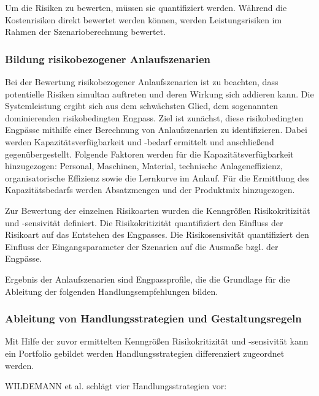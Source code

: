 Um die Risiken zu bewerten, müssen sie quantifiziert werden. Während die Kostenrisiken direkt bewertet werden können, werden Leistungsrisiken im Rahmen der Szenarioberechnung bewertet. 

\subsubsection*{Bildung risikobezogener Anlaufszenarien}\label{sec:wildemannszenarien}
Bei der Bewertung risikobezogener Anlaufszenarien ist zu beachten, dass potentielle Risiken simultan auftreten und deren Wirkung sich addieren kann. Die Systemleistung ergibt sich aus dem schwächsten Glied, dem sogenannten dominierenden risikobedingten Engpass. Ziel ist zunächst, diese risikobedingten Engpässe mithilfe einer Berechnung von Anlaufszenarien zu identifizieren. %
Dabei werden Kapazitätsverfügbarkeit und -bedarf ermittelt und anschließend gegenübergestellt. Folgende Faktoren werden für die Kapazitätsverfügbarkeit hinzugezogen: Personal, Maschinen, Material, technische Anlageneffizienz, organisatorische Effizienz sowie die Lernkurve im Anlauf. %
Für die Ermittlung des Kapazitätsbedarfs werden Absatzmengen und der Produktmix hinzugezogen. 

Zur Bewertung der einzelnen Risikoarten wurden die Kenngrößen Risikokritizität und -sensivität definiert. 
Die Risikokritizität quantifiziert den Einfluss der Risikoart auf das Entstehen des Engpasses. Die Risikosensivität quantifiziert den Einfluss der Eingangsparameter der Szenarien auf die Ausmaße bzgl. der Engpässe. 

Ergebnis der Anlaufszenarien sind Engpassprofile, die die Grundlage für die Ableitung der folgenden Handlungsempfehlungen bilden. 

\subsubsection*{Ableitung von Handlungsstrategien und Gestaltungsregeln}

Mit Hilfe der zuvor ermittelten Kenngrößen Risikokritizität und -sensivität kann ein Portfolio gebildet werden Handlungsstrategien differenziert zugeordnet werden. 

WILDEMANN et al. schlägt vier Handlungsstrategien vor: 

